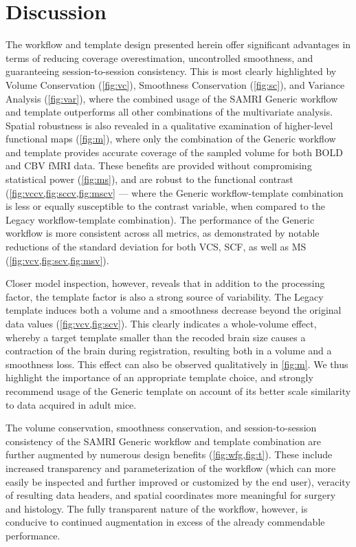 \section{Discussion}

The workflow and template design presented herein offer significant advantages in terms of reducing coverage overestimation, uncontrolled smoothness, and guaranteeing session-to-session consistency.
This is most clearly highlighted by Volume Conservation (\cref{fig:vc}), Smoothness Conservation (\cref{fig:sc}), and Variance Analysis (\cref{fig:var}), where the combined usage of the SAMRI Generic workflow and template outperforms all other combinations of the multivariate analysis.
Spatial robustness is also revealed in a qualitative examination of higher-level functional maps (\cref{fig:m}), where only the combination of the Generic workflow and template provides accurate coverage of the sampled volume for both BOLD and CBV fMRI data.
These benefits are provided without compromising statistical power (\cref{fig:ms}), and are robust to the functional contrast (\cref{fig:vccv,fig:sccv,fig:mscv} --- where the Generic workflow-template combination is less or equally susceptible to the contrast variable, when compared to the Legacy workflow-template combination).
The performance of the Generic workflow is more consistent across all metrics, as demonstrated by notable reductions of the standard deviation for both VCS, SCF, as well as MS (\cref{fig:vcv,fig:scv,fig:msv}).

Closer model inspection, however, reveals that in addition to the processing factor, the template factor is also a strong source of variability.
The Legacy template induces both a volume and a smoothness decrease beyond the original data values (\cref{fig:vcv,fig:scv}).
This clearly indicates a whole-volume effect, whereby a target template smaller than the recoded brain size causes a contraction of the brain during registration, resulting both in a volume and a smoothness loss.
This effect can also be observed qualitatively in \cref{fig:m}.
We thus highlight the importance of an appropriate template choice, and strongly recommend usage of the Generic template on account of its better scale similarity to data acquired in adult mice.

The volume conservation, smoothness conservation, and session-to-session consistency of the SAMRI Generic workflow and template combination are further augmented by numerous design benefits (\cref{fig:wfg,fig:t}).
These include increased transparency and parameterization of the workflow (which can more easily be inspected and further improved or customized by the end user), veracity of resulting data headers, and spatial coordinates more meaningful for surgery and histology.
The fully transparent nature of the workflow, however, is conducive to continued augmentation in excess of the already commendable performance.

